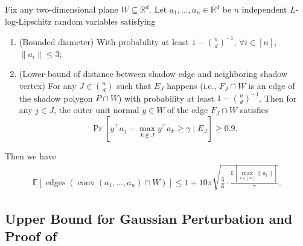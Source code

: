 \documentclass{article}\usepackage[a4paper,margin=20mm]{geometry}
\newcommand{\R}{\mathbb R}
\newcommand{\E}{\mathbb E}
\newcommand{\conv}{\operatorname{conv}}
\newcommand{\edges}{\operatorname{edges}}
\renewcommand{\subset}{\subseteq}
\begin{document}
\begin{lemma}\label{lem:ub-lipschitz}
    Fix any two-dimensional plane $W \subset \R^d$.
    Let $a_1, \ldots, a_n \in \R^d$ be $n$ independent $L$-log-Lipschitz random variables satisfying
    \begin{enumerate}
        \item (Bounded diameter) With probability at least $1 - \binom{n}{d}^{-1}$, $\forall i \in [n]$, $\|a_i\| \leq 3$;
        \item (Lower-bound of distance between shadow edge and neighboring shadow vertex) 
        For any $J \in \binom{n}{d}$ such that $E_J$ happens (i.e., $F_J \cap W$ is an edge of the shadow polygon $P \cap W$) with probability at least $1 - \binom{n}{d}^{-1}$.
        Then for any $j\in J$, the outer unit normal $y \in W$ of the edge $F_J \cap W$ satisfies 
        $$\Pr[y^\top a_j - \max_{k \notin J} y^\top a_k \geq \gamma \mid E_J] \geq 0.9 .$$
    \end{enumerate}
    Then we have 
    \begin{align*}
        \E\left[ \edges\left(\conv(a_1, \ldots, a_n) \cap W \right) \right] \leq 1 + 10\pi \sqrt{\frac{5}{6} \cdot \frac{\E[\max_{i \in [n]}\|a_i\|]}{\gamma}}.
    \end{align*}
\end{lemma}

\subsection{Upper Bound for Gaussian Perturbation and Proof of }\label{sec:from-gaussian-to-lip}
\end{document}
